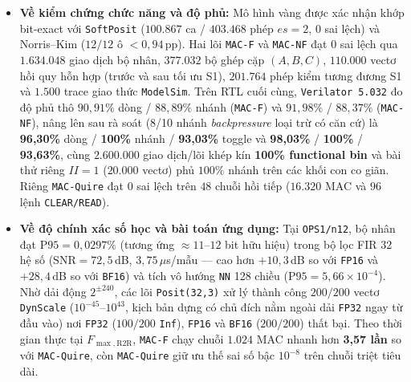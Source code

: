 \begin{itemize}
        từ lượt $10$\,ns), \texttt{MAC-F} bù lại bằng \texttt{0 DSP}, ít hơn $48{,}6\%$ FF so với
        \texttt{FP32 0-DSP}, dải động $2^{\pm 240}$ và bám sát thông lượng của
        \texttt{Xilinx FP32 0-DSP} khi chạy một chuỗi tích lũy phụ thuộc đơn lẻ
        ($8{,}53$ so với $8{,}88$\,M\,MAC/s; nếu xen kẽ nhiều chuỗi độc lập như nhiều
        đầu ra FIR thì Xilinx lấy lại $II=1$).
  \item \textbf{Về kiểm chứng chức năng và độ phủ:} Mô hình vàng được xác nhận
        khớp bit-exact với \texttt{SoftPosit} ($100.867$ ca / $403.468$ phép $es=2$,
        $0$ sai lệch) và Norris--Kim ($12/12$ ô $<0{,}94$\,pp). Hai lõi
        \texttt{MAC-F} và \texttt{MAC-NF} đạt $0$ sai lệch qua $1.634.048$ giao
        dịch bộ nhân, $377.032$ bộ ghép cặp $(A,B,C)$, $110.000$ vectơ hồi quy
        hỗn hợp (trước và sau tối ưu S1), $201.764$ phép kiểm tương đương S1 và
        $1.500$ trace giao thức \texttt{ModelSim}. Trên RTL cuối cùng,
        \texttt{Verilator 5.032} đo độ phủ thô $90{,}91\%$ dòng / $88{,}89\%$
        nhánh (\texttt{MAC-F}) và $91{,}98\%$ / $88{,}37\%$ (\texttt{MAC-NF}),
        nâng lên sau rà soát (8/10 nhánh \textit{backpressure} loại trừ có căn
        cứ) là \textbf{96,30\%} dòng / \textbf{100\%} nhánh / \textbf{93,03\%}
        toggle và \textbf{98,03\%} / \textbf{100\%} / \textbf{93,63\%}, cùng
        $2.600.000$ giao dịch/lõi khép kín \textbf{100\% functional bin} và bài
        thử riêng $II=1$ ($20.000$ vectơ) phủ $100\%$ nhánh trên các khối con co
        giãn. Riêng \texttt{MAC-Quire} đạt $0$ sai lệch trên $48$ chuỗi hồi tiếp
        ($16.320$ MAC và $96$ lệnh \texttt{CLEAR/READ}).
  \item \textbf{Về độ chính xác số học và bài toán ứng dụng:} Tại \texttt{OPS1/n12},
        bộ nhân đạt $\mathrm{P95} = 0{,}0297\%$ (tương ứng $\approx 11\text{--}12$
        bit hữu hiệu) trong bộ lọc FIR 32 hệ số ($\mathrm{SNR}=72{,}5$\,dB,
        $3{,}75\,\mu$s/mẫu --- cao hơn $+10{,}3$\,dB so với \texttt{FP16} và
        $+28{,}4$\,dB so với \texttt{BF16}) và tích vô hướng \texttt{NN} 128 chiều
        ($\mathrm{P95}=5{,}66{\times}10^{-4}$). Nhờ dải động $2^{\pm 240}$, các
        lõi \texttt{Posit(32,3)} xử lý thành công $200/200$ vectơ \texttt{DynScale}
        ($10^{-45}\text{--}10^{43}$, kịch bản dựng có chủ đích nằm ngoài dải \texttt{FP32}
        ngay từ đầu vào) nơi \texttt{FP32} ($100/200$ \texttt{Inf}),
        \texttt{FP16} và \texttt{BF16} ($200/200$) thất bại. Theo thời gian thực
        tại $F_{\max,\mathrm{R2R}}$, \texttt{MAC-F} chạy chuỗi $1.024$ MAC nhanh
        hơn \textbf{3,57 lần} so với \texttt{MAC-Quire}, còn \texttt{MAC-Quire}
        giữ ưu thế sai số bậc $10^{-8}$ trên chuỗi triệt tiêu dài.
\end{itemize}

